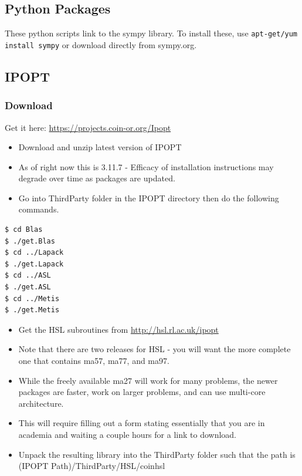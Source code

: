 \documentclass[11pt]{article}
\begin{document}
\subsection{Python Packages}
These python scripts link to the sympy library.  To install these, use \texttt{apt-get/yum install sympy} or download directly from sympy.org.
\subsection{IPOPT}
\subsubsection*{Download}
Get it here: \url{https://projects.coin-or.org/Ipopt}
\begin{itemize}
\item Download and unzip latest version of IPOPT 
\item As of right now this is 3.11.7 - Efficacy of installation instructions may degrade over time as packages are updated.
\item Go into ThirdParty folder in the IPOPT directory then do the following commands.
\end{itemize}
\begin{verbatim}
$ cd Blas
$ ./get.Blas
$ cd ../Lapack
$ ./get.Lapack
$ cd ../ASL
$ ./get.ASL
$ cd ../Metis
$ ./get.Metis
\end{verbatim}
\begin{itemize}
\item Get the HSL subroutines from \url{http://hsl.rl.ac.uk/ipopt}
\item Note that there are two releases for HSL - you will want the more complete one that contains ma57, ma77, and ma97. 
\item While the freely available ma27 will work for many problems, the newer packages are faster, work on larger problems, and can use multi-core architecture.
\item This will require filling out a form stating essentially that you are in academia and waiting a couple hours for a link to download.
\item Unpack the resulting library into the ThirdParty folder such that the path is (IPOPT Path)/ThirdParty/HSL/coinhsl
\end{itemize}
\end{document}
